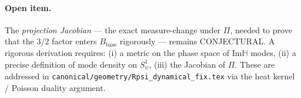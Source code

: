 \documentclass[12pt,a4paper]{article}
\theoremstyle{definition}
\theoremstyle{remark}
\begin{document}
\paragraph{Open item.}
The \emph{projection Jacobian} — the exact measure-change under $\Pi$, needed to
prove that the 3/2 factor enters $B_{\mathrm{base}}$ rigorously — remains
CONJECTURAL.  A rigorous derivation requires:
(i) a metric on the phase space of Im$\mathbb{H}$ modes,
(ii) a precise definition of mode density on $S^1_\psi$,
(iii) the Jacobian of $\Pi$.
These are addressed in \texttt{canonical/geometry/Rpsi\_dynamical\_fix.tex}
via the heat kernel / Poisson duality argument.

\ifdefined\INCLUDEMODE
\else
  
\end{document}
